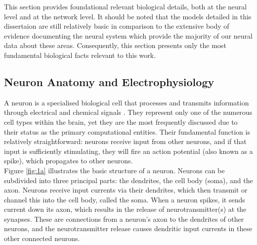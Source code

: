 \noindent This section provides foundational relevant biological details, both at the neural level and at the network level. It should be noted that the models detailed in this dissertaion are still relatively basic in comparison to the extensive body of evidence documenting the neural system \cite{kandel2000principles} which provide the majority of our neural data about these areas. Consequently, this section presents only the most fundamental biological facts relevant to this work.\\

\subsection[Neuron Anatomy and Electrophysiology]{Neuron Anatomy and Electrophysiology}

\noindent  A neuron is a specialised biological cell that processes and transmits information through electrical and chemical signals \cite{mel1994information}. They represent only one of the numerous cell types within the brain, yet they are the most frequently discussed due to their status as the primary computational entities. Their fundamental function is relatively straightforward: neurons receive input from other neurons, and if that input is sufficiently stimulating, they will fire an action potential (also known as a spike), which propagates to other neurons.\\

\noindent Figure \ref{fig:1a} illustrates the basic structure of a neuron. Neurons can be subdivided into three principal parts: the dendrites, the cell body (soma), and the axon. Neurons receive input currents via their dendrites, which then transmit or channel this into the cell body, called the soma. When a neuron spikes, it sends current down its axon, which results in the release of neurotransmitter(s) at the synapses. These are connections from a neuron's axon to the dendrites of other neurons, and the neurotransmitter release causes dendritic input currents in these other connected neurons. \\

